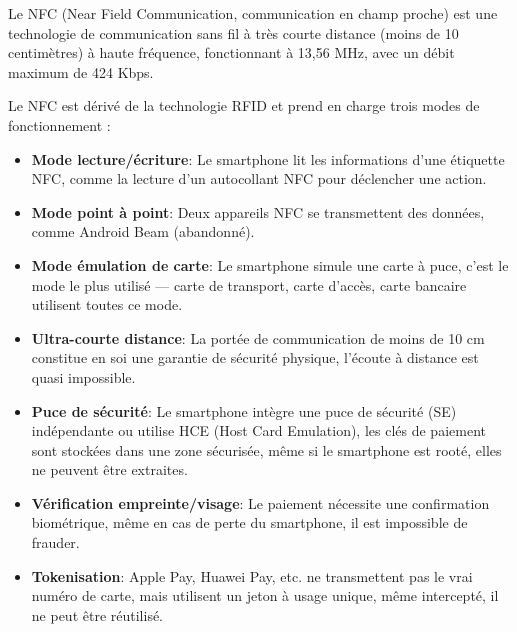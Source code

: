 
Le NFC (Near Field Communication, communication en champ proche) est une technologie de communication sans fil à très courte distance (moins de 10 centimètres) à haute fréquence, fonctionnant à 13,56 MHz, avec un débit maximum de 424 Kbps.


Le NFC est dérivé de la technologie RFID et prend en charge trois modes de fonctionnement :

\begin{itemize}
  \item \textbf{Mode lecture/écriture}: Le smartphone lit les informations d'une étiquette NFC, comme la lecture d'un autocollant NFC pour déclencher une action.
  \item \textbf{Mode point à point}: Deux appareils NFC se transmettent des données, comme Android Beam (abandonné).
  \item \textbf{Mode émulation de carte}: Le smartphone simule une carte à puce, c'est le mode le plus utilisé — carte de transport, carte d'accès, carte bancaire utilisent toutes ce mode.
\end{itemize}


\begin{itemize}
  \item \textbf{Ultra-courte distance}: La portée de communication de moins de 10 cm constitue en soi une garantie de sécurité physique, l'écoute à distance est quasi impossible.
  \item \textbf{Puce de sécurité}: Le smartphone intègre une puce de sécurité (SE) indépendante ou utilise HCE (Host Card Emulation), les clés de paiement sont stockées dans une zone sécurisée, même si le smartphone est rooté, elles ne peuvent être extraites.
  \item \textbf{Vérification empreinte/visage}: Le paiement nécessite une confirmation biométrique, même en cas de perte du smartphone, il est impossible de frauder.
  \item \textbf{Tokenisation}: Apple Pay, Huawei Pay, etc. ne transmettent pas le vrai numéro de carte, mais utilisent un jeton à usage unique, même intercepté, il ne peut être réutilisé.
\end{itemize}


